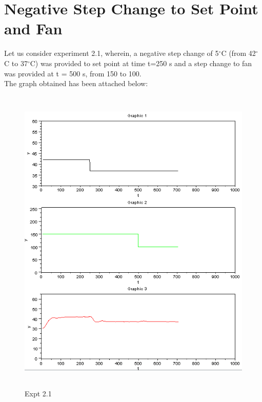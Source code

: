 \section{Negative Step Change to Set Point and Fan}
Let us consider experiment 2.1, wherein, a negative step change of 5$^\circ$C (from 42$^\circ$C to 37$^\circ$C) was provided to set point at time t=250 s and a step change to fan was provided at t = 500 s, from 150 to 100. \\
The graph obtained has been attached below:\\
\begin{figure}[H]
  \includegraphics[width=12cm, height=15cm]{mpc/2_1.PNG}
  \caption{Expt 2.1}
\end{figure}
